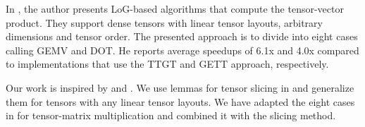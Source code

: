 In \cite{bassoy:2019:ttv}, the author presents LoG-based algorithms that compute the tensor-vector product. 
They support dense tensors with linear tensor layouts, arbitrary dimensions and tensor order.
The presented approach is to divide into eight cases calling GEMV and DOT.
He reports average speedups of 6.1x and 4.0x compared to implementations that use the TTGT and GETT approach, respectively.

Our work is inspired by \cite{li:2015:input} and \cite{bassoy:2019:ttv}.
We use lemmas for tensor slicing in \cite{li:2015:input} and generalize them for tensors with any linear tensor layouts. 
We have adapted the eight cases in \cite{bassoy:2019:ttv} for tensor-matrix multiplication and combined it with the slicing method.